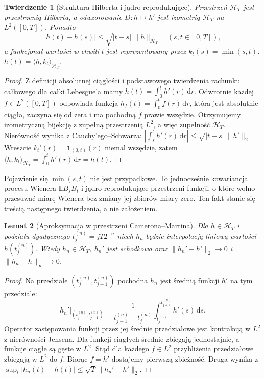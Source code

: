 \documentclass[11pt,a4paper,oneside]{report}
\numberwithin{equation}{chapter}
\theoremstyle{plain}
\newtheorem{twierdzenie}{Twierdzenie}[chapter]
\newtheorem{lemat}[twierdzenie]{Lemat}
\theoremstyle{definition}
\theoremstyle{remark}
\newcommand{\E}{\mathbb{E}}
\newcommand{\calH}{\mathcal{H}}
\newcommand{\ind}[1]{\mathbf{1}_{#1}}
\newcommand{\dd}{\mathrm{d}}
\begin{document}
\begin{twierdzenie}[Struktura Hilberta i jądro reprodukujące]
\label{th:cm-hilbert}
Przestrzeń $\calH_T$ jest przestrzenią Hilberta,
a odwzorowanie $D:h\mapsto h'$ jest izometrią
$\calH_T$ na $L^2([0,T])$. Ponadto
\[
|h(t)-h(s)|\le\sqrt{|t-s|}\,\|h\|_{\calH_T}
\quad(s,t\in[0,T]),
\]
a funkcjonał wartości w chwili $t$ jest reprezentowany
przez $k_t(s)=\min(s,t)$:
$h(t)=\langle h,k_t\rangle_{\calH_T}$.
\end{twierdzenie}
\begin{proof}
Z definicji absolutnej ciągłości i podstawowego twierdzenia
rachunku całkowego dla całki Lebesgue'a mamy
$h(t)=\int_0^t h'(r)\,\dd r$. Odwrotnie każdej
$f\in L^2([0,T])$ odpowiada funkcja
$h_f(t)=\int_0^t f(r)\,\dd r$, która jest absolutnie
ciągła, zaczyna się od zera i ma pochodną $f$ prawie
wszędzie. Otrzymujemy izometryczną bijekcję z zupełną
przestrzenią $L^2$, a więc zupełność $\calH_T$.
Nierówność wynika z Cauchy'ego--Schwarza:
$|\int_s^t h'(r)\,\dd r|\le\sqrt{|t-s|}\,\|h'\|_2$.
Wreszcie $k_t'(r)=\ind{(0,t)}(r)$ niemal wszędzie, zatem
$\langle h,k_t\rangle_{\calH_T}=\int_0^t h'(r)\,\dd r=h(t)$.
\end{proof}

Pojawienie się $\min(s,t)$ nie jest przypadkowe. To jednocześnie
kowariancja procesu Wienera $\E B_sB_t$ i jądro reprodukujące
przestrzeni funkcji, o które wolno przesuwać miarę Wienera
bez zmiany jej zbiorów miary zero. Ten fakt stanie się treścią
następnego twierdzenia, a nie założeniem.

\begin{lemat}[Aproksymacja w przestrzeni Camerona--Martina]
\label{lem:cm-approx}
Dla $h\in\calH_T$ i podziału dyadycznego
$t_j^{(n)}=jT2^{-n}$ niech $h_n$ będzie interpolacją liniową
wartości $h(t_j^{(n)})$. Wtedy $h_n\in\calH_T$,
$h_n'$ jest schodkowa oraz
$\|h_n'-h'\|_2\to0$ i $\|h_n-h\|_\infty\to0$.
\end{lemat}
\begin{proof}
Na przedziale $(t_j^{(n)},t_{j+1}^{(n)})$ pochodna $h_n$
jest średnią funkcji $h'$ na tym przedziale:
\[
 h_n'|_{(t_j^{(n)},t_{j+1}^{(n)})}
 =\frac{1}{t_{j+1}^{(n)}-t_j^{(n)}}
 \int_{t_j^{(n)}}^{t_{j+1}^{(n)}}h'(s)\,\dd s.
\]
Operator zastępowania funkcji przez jej średnie przedziałowe
jest kontrakcją w $L^2$ z nierówności Jensena.
Dla funkcji ciągłych średnie zbiegają jednostajnie,
a funkcje ciągłe są gęste w $L^2$. Stąd dla każdego
$f\in L^2$ przybliżenia przedziałowe zbiegają w $L^2$ do $f$.
Biorąc $f=h'$ dostajemy pierwszą zbieżność. Druga wynika
z $\sup_t|h_n(t)-h(t)|\le\sqrt T\|h_n'-h'\|_2$.
\end{proof}
\end{document}
